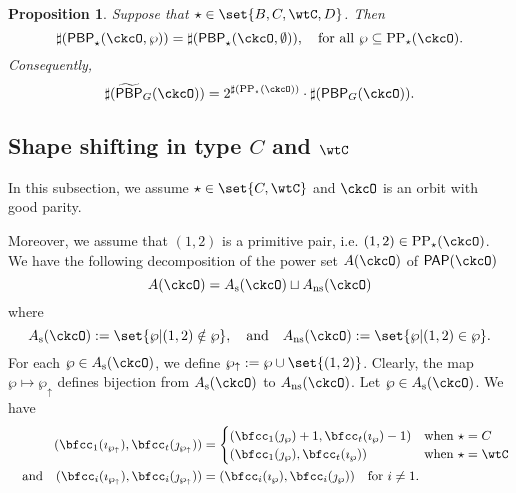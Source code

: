 \documentclass[12pt,a4paper]{amsart}
\def\subset{\subseteq}
\numberwithin{equation}{section}
\newtheorem{prop}[thm]{Proposition}
\theoremstyle{remark}
\def\PP{\mathsf{PAP}}
\def\AND{\quad \text{and} \quad}
\def\CPPs{\mathrm{PP}_{\star}}
\def\tPBP{\widetilde{\mathsf{PBP}}}
\def\PBP{\mathsf{PBP}}
\def\tPBP{\widetilde{\mathsf{PBP}}}
\def\PBPop#1#2#3#4{\PBP_{#1}^{#2}(#3,#4)}
\newcommand{\PBPOP}[1][]{\PBPop{\star}{#1}{\ckcO}{\wp}}
\def\Ass{A_{\mathrm{s}}}
\def\Ans{A_{\mathrm{ns}}}
\def\wpu{\wp_{\uparrow}}
\def\wpd{\wp} %
\def\PPm{\wp_{\downarrow}}
\begin{document}
\begin{prop} \label{prop:PBP2} Suppose that   $\star\in \set{B,C,\wtC,D}$. Then
  \[
    \sharp(\PBPOP) = \sharp(\PBPop{\star}{}{\ckcO}{\emptyset}), \quad \textrm{for all } \wp \subset \CPPs(\ckcO).
  \]
 Consequently,
     \[
     \sharp(\tPBP_{G}(\ckcO)) = 2^{\sharp(\CPPs(\ckcO))}\cdot \sharp(\PBP_{G}(\ckcO)).
  \]
\end{prop}


 \subsection{Shape shifting in type $C$ and $\wtC$}
 In this subsection, we assume $\star \in \set{C,\wtC}$ and $\ckcO$ is an orbit
 with good parity.



 Moreover, we assume that $(1,2)$ is a primitive pair, i.e.
 $(1,2)\in \CPPs(\ckcO)$. We have the following decomposition of the power set
 $A(\ckcO)$ of $\PP(\ckcO)$
 \[
   A(\ckcO) = \Ass(\ckcO) \sqcup \Ans(\ckcO)
 \]
 where
 \[
 \Ass(\ckcO): = \set{\wp | (1,2)\notin \wp}, \AND
 \Ans(\ckcO): = \set{\wp | (1,2)\in \wp}.
 \]
 For each $\wp\in \Ass(\ckcO)$, we
 define $\wp_{\uparrow}:= \wp\cup \set{(1,2)}$. Clearly, the map
 $\wp \mapsto \wp_{\uparrow}$ defines bijection from $\Ass(\ckcO)$ to
 $\Ans(\ckcO)$.
 Let $\wp\in \Ass(\ckcO)$. We have
  \[
    \begin{split}
      (\bfcc_{1}(\imath_{\wpu}), \bfcc_{t}(\jmath_{\wpu})) &=
      \begin{cases}
        (\bfcc_{1}(\jmath_{\wpd})+1, \bfcc_{t}(\imath_{\wpd})-1) & \text{when
        } \star = C\\
        (\bfcc_{1}(\jmath_{\wpd}), \bfcc_{t}(\imath_{\wpd}))& \text{when
        } \star = \wtC\\
      \end{cases}
      \\
      \AND
      (\bfcc_{i}(\imath_{\wpu}),\bfcc_{i}(\jmath_{\wpu})) &=(\bfcc_{i}(\imath_{\wpd}),\bfcc_{i}(\jmath_{\wpd}))\quad \text{for $i\neq 1$}.
    \end{split}
  \]
\end{document}
